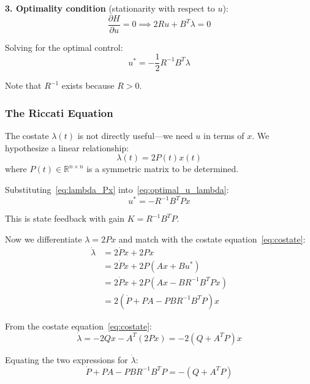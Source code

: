 \textbf{3. Optimality condition} (stationarity with respect to $u$):
\begin{equation}
\frac{\partial H}{\partial u} = 0 \implies 2Ru + B^T \lambda = 0
\end{equation}

Solving for the optimal control:
\begin{equation}
\boxed{u^* = -\frac{1}{2} R^{-1} B^T \lambda}
\label{eq:optimal_u_lambda}
\end{equation}

Note that $R^{-1}$ exists because $R > 0$.

\subsubsection{The Riccati Equation}

The costate $\lambda(t)$ is not directly useful---we need $u$ in terms of $x$. We hypothesize a linear relationship:
\begin{equation}
\lambda(t) = 2P(t) x(t)
\label{eq:lambda_Px}
\end{equation}
where $P(t) \in \mathbb{R}^{n \times n}$ is a symmetric matrix to be determined.

Substituting~\eqref{eq:lambda_Px} into~\eqref{eq:optimal_u_lambda}:
\begin{equation}
u^* = -R^{-1} B^T P x
\label{eq:optimal_u_K}
\end{equation}

This is state feedback with gain $K = R^{-1} B^T P$.

Now we differentiate $\lambda = 2Px$ and match with the costate equation~\eqref{eq:costate}:
\begin{align}
\dot{\lambda} &= 2\dot{P}x + 2P\dot{x} \\
&= 2\dot{P}x + 2P(Ax + Bu^*) \\
&= 2\dot{P}x + 2P(Ax - BR^{-1}B^T P x) \\
&= 2\left( \dot{P} + PA - PBR^{-1}B^T P \right) x
\end{align}

From the costate equation~\eqref{eq:costate}:
\begin{equation}
\dot{\lambda} = -2Qx - A^T (2Px) = -2(Q + A^T P)x
\end{equation}

Equating the two expressions for $\dot{\lambda}$:
\begin{equation}
\dot{P} + PA - PBR^{-1}B^T P = -(Q + A^T P)
\end{equation}

